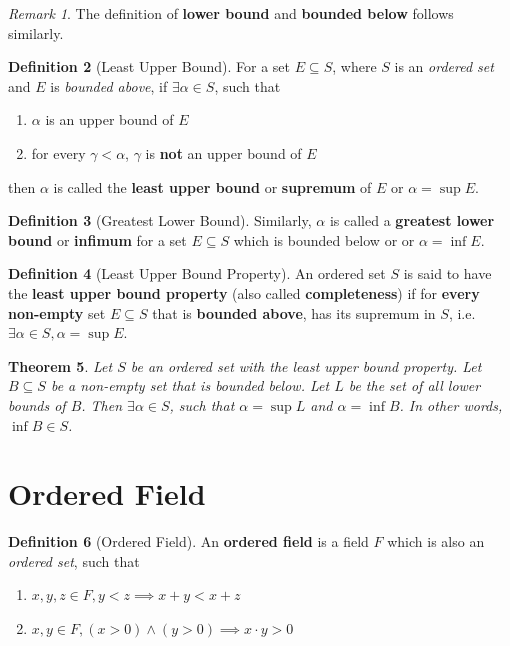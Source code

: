 \documentclass[a4paper,12pt]{report}
\newcommand{\tb}{\textbf}
\theoremstyle{plain}
\newtheorem{theorem}{\color{blue}Theorem}[chapter] %
\theoremstyle{definition}
\newtheorem{definition}[theorem]{\color{red}Definition} %
\theoremstyle{remark}
\newtheorem{remark}[theorem]{\color{ForestGreen}Remark} %
\begin{document}
\begin{remark}
The definition of \tb{lower bound} and \tb{bounded below} follows similarly.
\end{remark}
\begin{definition}[Least Upper Bound]
For a set $E\subseteq S$, where $S$ is an \emph{ordered set} and $E$ is \emph{bounded above}, if $\exists\alpha\in S$, such that
\begin{enumerate}
\item $\alpha$ is an upper bound of $E$
\item for every $\gamma<\alpha$, $\gamma$ is \tb{not} an upper bound of $E$
\end{enumerate}
then $\alpha$ is called the \tb{least upper bound} or \tb{supremum} of $E$ or $\alpha=\sup  E$.
\end{definition}
\begin{definition}[Greatest Lower Bound]
Similarly, $\alpha$ is called a \tb{greatest lower bound} or \tb{infimum} for a set $E\subseteq S$ which is bounded below or or $\alpha=\inf  E$.
\end{definition}
\begin{definition}[Least Upper Bound Property]
An ordered set $S$ is said to have the \tb{least upper bound property} (also called \tb{completeness}) if for \tb{every non-empty} set $E\subseteq S$ that is \tb{bounded above}, has its supremum in $S$, i.e. $\exists\alpha\in S, \alpha=\sup E$.
\end{definition}
\begin{theorem}
Let $S$ be an ordered set with the least upper bound property. Let $B\subseteq S$ be a non-empty set that is bounded below. Let $L$ be the set of all lower bounds of $B$. Then $\exists\alpha\in S$, such that $\alpha=\sup L$ and $\alpha=\inf B$. In other words, $\inf B\in S$.
\end{theorem}

\section{Ordered Field}
\begin{definition}[Ordered Field]
An \tb{ordered field} is a field $F$ which is also an \emph{ordered set}, such that
\begin{enumerate}
\item $x,y,z\in F, y<z\implies x+y<x+z$
\item $x,y\in F, (x>0)\wedge(y>0)\implies x\cdot y>0$
\end{enumerate}
\end{definition}
\end{document}
